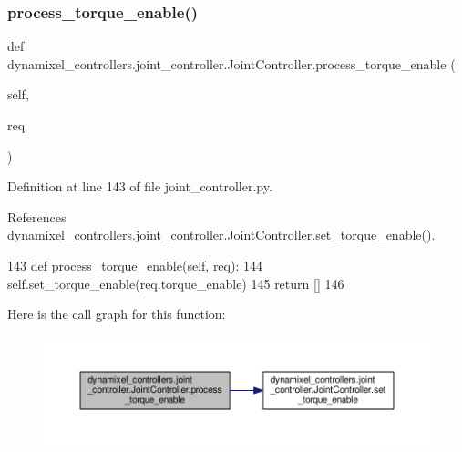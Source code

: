 \subsubsection{\texorpdfstring{process\+\_\+torque\+\_\+enable()}{process\_torque\_enable()}}
{\footnotesize\ttfamily def dynamixel\+\_\+controllers.\+joint\+\_\+controller.\+Joint\+Controller.\+process\+\_\+torque\+\_\+enable (\begin{DoxyParamCaption}\item[{}]{self,  }\item[{}]{req }\end{DoxyParamCaption})\hspace{0.3cm}{\ttfamily [inherited]}}



Definition at line 143 of file joint\+\_\+controller.\+py.



References dynamixel\+\_\+controllers.\+joint\+\_\+controller.\+Joint\+Controller.\+set\+\_\+torque\+\_\+enable().


\begin{DoxyCode}
143     \textcolor{keyword}{def }process\_torque\_enable(self, req):
144         self.set\_torque\_enable(req.torque\_enable)
145         \textcolor{keywordflow}{return} []
146 
\end{DoxyCode}
Here is the call graph for this function\+:
\nopagebreak
\begin{figure}[H]
\begin{center}
\leavevmode
\includegraphics[width=350pt]{d3/dcd/classdynamixel__controllers_1_1joint__controller_1_1_joint_controller_a2181fcf467234ed09e378a93ea5a0553_cgraph}
\end{center}
\end{figure}
\mbox{\label{classdynamixel__controllers_1_1joint__controller_1_1_joint_controller_aea21e76e178029b31cd40b3e0335b621}} 
